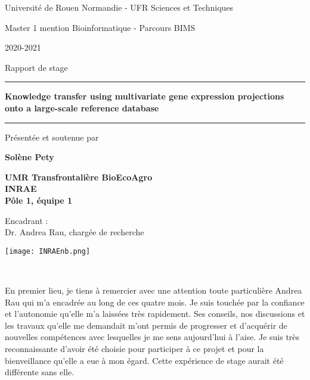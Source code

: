 \documentclass[twoside]{article}
\renewcommand{\thepage}{}
\begin{document}
\begin{center}
   \large Université de Rouen Normandie - UFR Sciences et Techniques
   
   \vspace{0.2cm}
   \large Master 1 mention Bioinformatique - Parcours BIMS
   
   \vspace{0.2cm}
   \large 2020-2021
   
   \vspace{2cm}
   \large Rapport de stage
   
   \vspace{1cm}
   \hrule
   \vspace{0.2cm}
        \Huge \textbf{Knowledge transfer using multivariate gene expression projections onto a large-scale reference database}
   \vspace{0.2cm}
   \hrule
   
   \vspace{1cm}
   \large Présentée et soutenue par
   
   \vspace{0.5cm}
   \huge \textbf{Solène Pety}
   
   \vspace{2.5cm}
   \large \textbf{UMR Transfrontalière BioEcoAgro\\INRAE\\Pôle 1, équipe 1}
   
   \vspace{1cm}
   \Large Encadrant :\\Dr. Andrea Rau, chargée de recherche
   
   \vspace{1cm}
\end{center}

\vfill %
\begin{center}
    \texttt{[image: INRAEnb.png]}
\end{center}

\newpage
\thispagestyle{empty}
~

\newpage
\pagestyle{fancy}
\renewcommand{\thepage}{\roman{page}}
\setcounter{page}{1}


\vspace{0.5cm}En premier lieu, je tiens à remercier avec une attention toute particulière Andrea Rau qui m'a encadrée au long de ces quatre mois. Je suis touchée par la confiance et l'autonomie qu'elle m'a laissées très rapidement. Ses conseils, nos discussions et les travaux qu'elle me demandait m'ont permis de progresser et d'acquérir de nouvelles compétences avec lesquelles je me sens aujourd'hui à l'aise. Je suis très reconnaissante d'avoir été choisie pour participer à ce projet et pour la bienveillance qu'elle a eue à mon égard. Cette expérience de stage aurait été différente sans elle.
\end{document}
